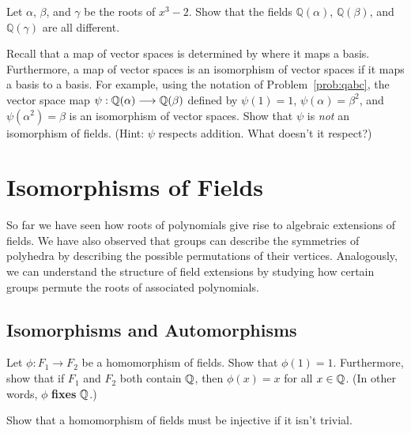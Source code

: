 \begin{problem}\label{prob:qabc}
Let $\alpha$, $\beta$, and $\gamma$ be the roots of $x^3-2$.  Show that the fields $\mathbb{Q}(\alpha)$, $\mathbb{Q}(\beta)$,  and $\mathbb{Q}(\gamma)$ are all different.
\end{problem}

\begin{problem}
    Recall that a map of vector spaces is determined by where it maps a basis. Furthermore, a map of vector spaces is an isomorphism of vector spaces if it maps a basis to a basis. For example, using the notation of Problem~\ref{prob:qabc}, the vector space map $\psi:\mathbb{Q}(\alpha) \longrightarrow \mathbb{Q}(\beta)$ defined by $\psi(1)=1$, $\psi(\alpha)=\beta^2$, and $\psi(\alpha^2)=\beta$ is an isomorphism of vector spaces. Show that $\psi$ is \textit{not} an isomorphism of fields. (Hint: $\psi$ respects addition. What doesn't it respect?)
\end{problem}

\chapter{Isomorphisms of Fields}\label{chap:isofields}

So far we have seen how roots of polynomials give rise to algebraic extensions of fields. We have also observed that groups can describe the symmetries of polyhedra by describing the possible permutations of their vertices. Analogously, we can understand the structure of field extensions by studying how certain groups permute the roots of associated polynomials.
\begin{annotation}
\end{annotation}

\section{Isomorphisms and Automorphisms}

\begin{problem}
Let $\phi: F_1 \longrightarrow F_2$ be a homomorphism of fields. Show that $\phi(1) = 1$. Furthermore, show that if $F_1$ and $F_2$ both contain $\mathbb{Q}$, then $\phi(x) = x$ for all $x\in \mathbb{Q}$. (In other words, $\phi$ \textbf{fixes} $\mathbb{Q}$.)
\end{problem}

\begin{problem}
Show that a homomorphism of fields must be injective if it isn't trivial.
\end{problem}


